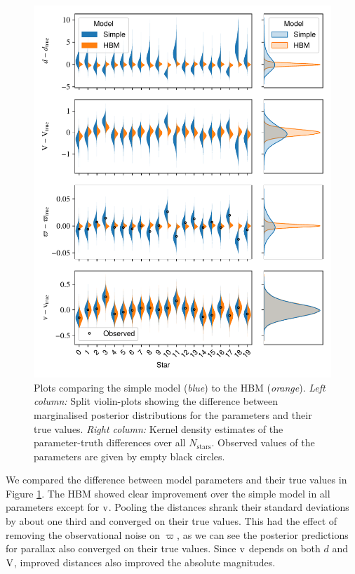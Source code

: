 \begin{figure}[p]
    \centering
    \includegraphics{figures/hbm-results.pdf}
    \caption{Plots comparing the simple model (\emph{blue}) to the HBM (\emph{orange}). \emph{Left column:} Split violin-plots showing the difference between marginalised posterior distributions for the parameters and their true values. \emph{Right column:} Kernel density estimates of the parameter-truth differences over all \(N_\mathrm{stars}\). Observed values of the parameters are given by empty black circles.}
    \label{fig:hbm-results}
\end{figure}

We compared the difference between model parameters and their true values in Figure \ref{fig:hbm-results}. The HBM showed clear improvement over the simple model in all parameters except for \(\mathrm{v}\). Pooling the distances shrank their standard deviations by about one third and converged on their true values. This had the effect of removing the observational noise on \(\varpi\), as we can see the posterior predictions for parallax also converged on their true values. Since \(\mathrm{v}\) depends on both \(d\) and \(\mathrm{V}\), improved distances also improved the absolute magnitudes.

